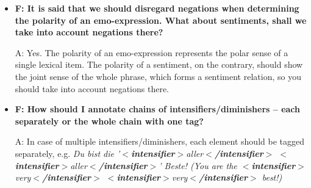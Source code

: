 \documentclass[11pt,a4paper]{article}
\newcommand{\xmltag}[1]{{\textbf{\small$<$#1$>$}}}
\newcommand{\intensifier}[1]{\xmltag{intensifier}#1\xmltag{/intensifier}}
\begin{document}
\begin{itemize}
\item\textbf{F: It is said that we should disregard negations when determining
  the polarity of an emo-expression.  What about sentiments, shall we take
  into account negations there?}

  A: Yes.  The polarity of an emo-expression represents the polar sense of a
  single lexical item.  The polarity of a sentiment, on the contrary, should
  show the joint sense of the whole phrase, which forms a sentiment relation,
  so you should take into account negations there.

\item\textbf{F: How should I annotate chains of intensifiers/diminishers --
  each separately or the whole chain with one tag?}

  A: In case of multiple intensifiers/diminishers, each element should be
  tagged separately, e.g. \textit{Du bist die '\intensifier{aller}
    \intensifier{aller}' Beste! (You are the \intensifier{very}
    \intensifier{very} best!)}


\end{itemize}
\end{document}
